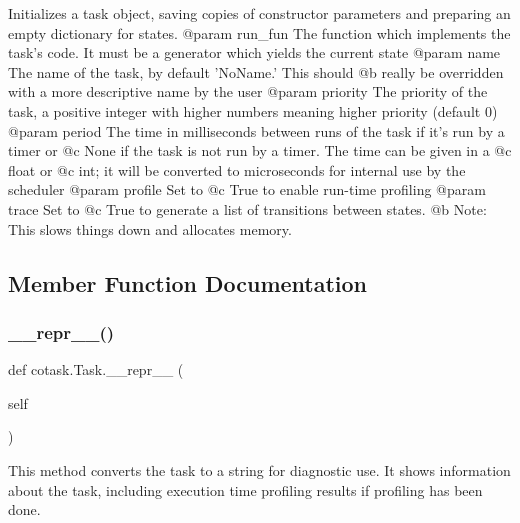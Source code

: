 \begin{DoxyVerb}Initializes a task object, saving copies of constructor parameters
and preparing an empty dictionary for states. 
@param run_fun The function which implements the task's code. It must
    be a generator which yields the current state
@param name The name of the task, by default 'NoName.' This should
    @b really be overridden with a more descriptive name by the user
@param priority The priority of the task, a positive integer with
    higher numbers meaning higher priority (default 0)
@param period The time in milliseconds between runs of the task if 
    it's run by a timer or @c None if the task is not run by a timer.
    The time can be given in a @c float or @c int; it will be 
    converted to microseconds for internal use by the scheduler
@param profile Set to @c True to enable run-time profiling 
@param trace Set to @c True to generate a list of transitions between
    states. @b Note: This slows things down and allocates memory. \end{DoxyVerb}
 

\subsection{Member Function Documentation}
\mbox{\label{classcotask_1_1Task_a2dcb50b9bf2676dfaac176649bc7d3f9}} 
\subsubsection{\texorpdfstring{\+\_\+\+\_\+repr\+\_\+\+\_\+()}{\_\_repr\_\_()}}
{\footnotesize\ttfamily def cotask.\+Task.\+\_\+\+\_\+repr\+\_\+\+\_\+ (\begin{DoxyParamCaption}\item[{}]{self }\end{DoxyParamCaption})}

\begin{DoxyVerb}This method converts the task to a string for diagnostic use.
It shows information about the task, including execution time
profiling results if profiling has been done. \end{DoxyVerb}
 \mbox{\label{classcotask_1_1Task_a6e51a228f985aec8c752bd72a73730ae}} 
